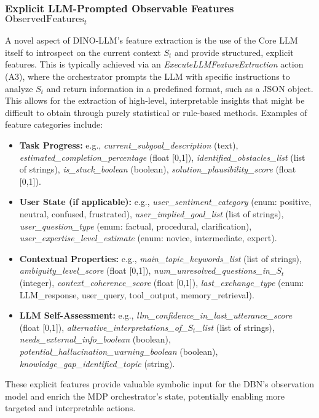 \documentclass[11pt]{article}
\begin{document}
\subsubsection{Explicit LLM-Prompted Observable Features $\text{ObservedFeatures}_t$}
\label{sssec:explicit_llm_features}
A novel aspect of DINO-LLM's feature extraction is the use of the Core LLM itself to introspect on the current context $S_t$ and provide structured, explicit features. This is typically achieved via an \emph{ExecuteLLMFeatureExtraction} action (A3), where the orchestrator prompts the LLM with specific instructions to analyze $S_t$ and return information in a predefined format, such as a JSON object. This allows for the extraction of high-level, interpretable insights that might be difficult to obtain through purely statistical or rule-based methods. Examples of feature categories include:
\begin{itemize}
    \item \textbf{Task Progress:} e.g., \emph{current\_subgoal\_description} (text), \emph{estimated\_completion\_percentage} (float [0,1]), \emph{identified\_obstacles\_list} (list of strings), \emph{is\_stuck\_boolean} (boolean), \emph{solution\_plausibility\_score} (float [0,1]).

    \item \textbf{User State (if applicable):} e.g., \emph{user\_sentiment\_category} (enum: positive, neutral, confused, frustrated), \emph{user\_implied\_goal\_list} (list of strings), \emph{user\_question\_type} (enum: factual, procedural, clarification), \emph{user\_expertise\_level\_estimate} (enum: novice, intermediate, expert).

    \item \textbf{Contextual Properties:} e.g., \emph{main\_topic\_keywords\_list} (list of strings), \emph{ambiguity\_level\_score} (float [0,1]), \emph{num\_unresolved\_questions\_in\_$S_t$} (integer), \emph{context\_coherence\_score} (float [0,1]), \emph{last\_exchange\_type} (enum: LLM\_response, user\_query, tool\_output, memory\_retrieval).

    \item \textbf{LLM Self-Assessment:} e.g., \emph{llm\_confidence\_in\_last\_utterance\_score} (float [0,1]), \emph{alternative\_interpretations\_of\_$S_t$\_list} (list of strings), \emph{needs\_external\_info\_boolean} (boolean), \emph{potential\_hallucination\_warning\_boolean} (boolean), \emph{knowledge\_gap\_identified\_topic} (string).
\end{itemize}
These explicit features provide valuable symbolic input for the DBN's observation model and enrich the MDP orchestrator's state, potentially enabling more targeted and interpretable actions.
\end{document}
